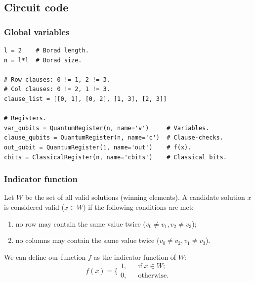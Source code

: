 \documentclass{article}
\begin{document}
\subsection{Circuit code}
\subsubsection{Global variables}
\begin{verbatim}
l = 2    # Borad length.
n = l*l  # Borad size.

# Row clauses: 0 != 1, 2 != 3.
# Col clauses: 0 != 2, 1 != 3.
clause_list = [[0, 1], [0, 2], [1, 3], [2, 3]]

# Registers.
var_qubits = QuantumRegister(n, name='v')     # Variables.
clause_qubits = QuantumRegister(n, name='c')  # Clause-checks.
out_qubit = QuantumRegister(1, name='out')    # f(x).
cbits = ClassicalRegister(n, name='cbits')    # Classical bits.
\end{verbatim}
\newpage
\subsubsection{Indicator function}
Let $W$ be the set of all valid
solutions (winning elements).
A candidate solution $x$ is considered valid ($x \in W$) if
the following conditions are met:
\begin{enumerate}
  \item
  no row may contain the same value twice ($v_0 \neq v_1, v_2 \neq v_3$);
  \item
  no columns may contain the same value twice ($v_0 \neq v_2, v_1 \neq v_3$).
\end{enumerate}
We can define our function $f$ as the indicator function of $W$:
\[
  f(x) = \bigg\{
  \begin{aligned}
    1, && \text{if} \; x \in W; \\
    0, && \text{otherwise}.
  \end{aligned}
\]
\end{document}
